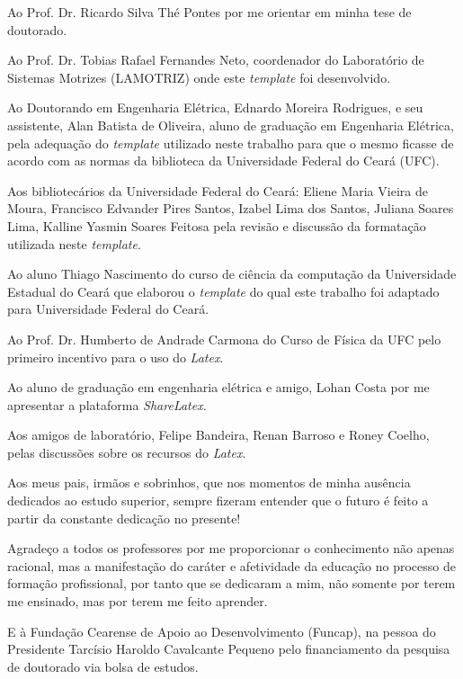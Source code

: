 

Ao Prof. Dr. Ricardo Silva Thé Pontes por me orientar em minha tese de doutorado.

Ao Prof. Dr. Tobias Rafael Fernandes Neto, coordenador do Laboratório de Sistemas Motrizes (LAMOTRIZ) onde este \textit{template} foi desenvolvido. 

Ao Doutorando em Engenharia Elétrica, Ednardo Moreira Rodrigues, e seu assistente, Alan Batista de Oliveira, aluno de graduação em Engenharia Elétrica, pela adequação do \textit{template} utilizado neste trabalho para que o mesmo ficasse de acordo com as normas da biblioteca da Universidade Federal do Ceará (UFC). %

Aos bibliotecários da Universidade Federal do Ceará: Eliene Maria Vieira de Moura, Francisco Edvander Pires Santos, Izabel Lima dos Santos, Juliana Soares Lima, Kalline Yasmin Soares Feitosa pela revisão e discussão da formatação utilizada neste \textit{template}. 

Ao aluno Thiago Nascimento do curso de ciência da computação da Universidade Estadual do Ceará que elaborou o \textit{template} do qual este trabalho foi adaptado para Universidade Federal do Ceará.

Ao Prof. Dr. Humberto de Andrade Carmona do Curso de Física da UFC pelo primeiro incentivo para o uso do \textit{Latex}.

Ao aluno de graduação em engenharia elétrica e amigo, Lohan Costa por me apresentar a plataforma \textit{ShareLatex}. 

Aos amigos de laboratório, Felipe Bandeira, Renan Barroso e Roney Coelho, pelas discussões sobre os recursos do \textit{Latex}.

Aos meus pais, irmãos e sobrinhos, que nos momentos de minha ausência dedicados ao estudo superior, sempre fizeram entender que o futuro é feito a partir da constante dedicação no presente!

Agradeço a todos os professores por me proporcionar o conhecimento não apenas racional, mas a manifestação do caráter e afetividade da educação no processo de formação profissional, por tanto que se dedicaram a mim, não somente por terem me ensinado, mas por terem me feito aprender. 

E à Fundação Cearense de Apoio ao Desenvolvimento (Funcap), na pessoa do Presidente Tarcísio Haroldo Cavalcante Pequeno pelo financiamento da pesquisa de doutorado via bolsa de estudos.
